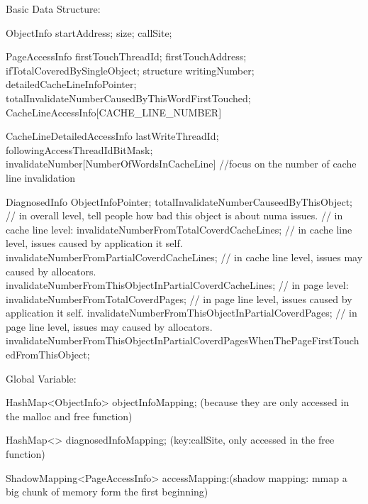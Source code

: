 Basic Data Structure:

        ObjectInfo {
            startAddress;
            size;
            callSite;
        }

        PageAccessInfo{
            firstTouchThreadId;
            firstTouchAddress;
            ifTotalCoveredBySingleObject;
            structure {
                writingNumber;
                detailedCacheLineInfoPointer;
                totalInvalidateNumberCausedByThisWordFirstTouched;
            }CacheLineAccessInfo[CACHE_LINE_NUMBER]
        }

        CacheLineDetailedAccessInfo {
            lastWriteThreadId;
            followingAccessThreadIdBitMask;
            invalidateNumber[NumberOfWordsInCacheLine]
        }   //focus on the number of cache line invalidation

        DiagnosedInfo {
            ObjectInfoPointer;
            totalInvalidateNumberCauseedByThisObject;   // in overall level, tell people how bad this object is about numa issues.
            // in cache line level:
            invalidateNumberFromTotalCoverdCacheLines;   // in cache line level, issues caused by application it self.
            invalidateNumberFromPartialCoverdCacheLines;  // in cache line level, issues may caused by allocators.
            invalidateNumberFromThisObjectInPartialCoverdCacheLines;
            // in page level:
            invalidateNumberFromTotalCoverdPages;    // in page line level, issues caused by application it self.
            invalidateNumberFromThisObjectInPartialCoverdPages;   // in page line level, issues may caused by allocators.
            invalidateNumberFromThisObjectInPartialCoverdPagesWhenThePageFirstTouchedFromThisObject;
        }


Global Variable:

        HashMap<ObjectInfo> objectInfoMapping; (because they are only accessed in the malloc and free function)

        HashMap<> diagnosedInfoMapping; (key:callSite, only accessed in the free function)

        ShadowMapping<PageAccessInfo> accessMapping:(shadow mapping: mmap a big chunk of memory form the first beginning)

